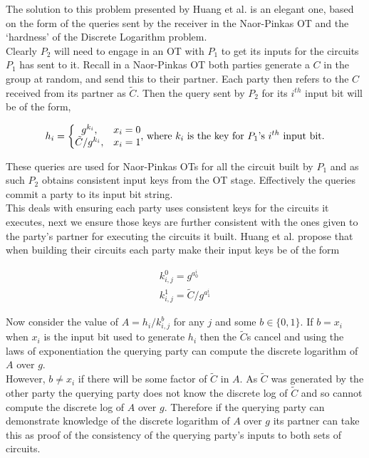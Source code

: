 \documentclass[ %
                    author={Nicholas Tutte},
                supervisor={Prof. Nigel Smart},
                    degree={MEng},
                     title={Secure Two Party Computation},
                  subtitle={A practical comparison of recent protocols},
                      type={Research - GG1K},
                      year={2015} ]{dissertation}
\begin{document}
				The solution to this problem presented by Huang et al. is an elegant one, based on the form of the queries sent by the receiver in the Naor-Pinkas OT and the `hardness' of the Discrete Logarithm problem.\\

				Clearly $P_2$ will need to engage in an OT with $P_1$ to get its inputs for the circuits $P_1$ has sent to it. Recall in a Naor-Pinkas OT both parties generate a $C$ in the group at random, and send this to their partner. Each party then refers to the $C$ received from its partner as $\tilde C$. Then the query sent by $P_2$ for its $i^{th}$ input bit will be of the form,

				$$
				h_i = \bigg\{
					\begin{matrix}
						g^{k_i}, & x_i = 0\\
						\tilde C / g^{k_i}, & x_i = 1
					\end{matrix}
					\textnormal{,  where } k_i \textnormal{ is the key for } P_1 \textnormal{'s } i^{th} \textnormal{ input bit.}
				$$

				These queries are used for Naor-Pinkas OTs for all the circuit built by $P_1$ and as such $P_2$ obtains consistent input keys from the OT stage. Effectively the queries commit a party to its input bit string.\\

				This deals with ensuring each party uses consistent keys for the circuits it executes, next we ensure those keys are further consistent with the ones given to the party's partner for executing the circuits it built. Huang et al. propose that when building their circuits each party make their input keys be of the form
				
				$$
				\begin{matrix}
					k_{i,j}^0 = g^{a_0^i}\\
					k_{i,j}^1 = \tilde C / g^{a_1^i}
				\end{matrix}
				$$

				Now consider the value of $A = h_i / k_{i,j}^{b}$ for any $j$ and some $b \in \{0, 1\}$. If $b = x_i$ when $x_i$ is the input bit used to generate $h_i$ then the $\tilde C$s cancel and using the laws of exponentiation the querying party can compute the discrete logarithm of $A$ over $g$.\\

				However, $b \neq x_i$ if there will be some factor of $\tilde C$ in $A$. As $\tilde C$ was generated by the other party the querying party does not know the discrete log of $\tilde C$ and so cannot compute the discrete log of $A$ over $g$. Therefore if the querying party can demonstrate knowledge of the discrete logarithm of $A$ over $g$ its partner can take this as proof of the consistency of the querying party's inputs to both sets of circuits.
\end{document}
